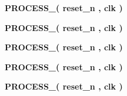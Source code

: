 \begin{DoxyCompactItemize}
\item 
{\bf P\+R\+O\+C\+E\+S\+S\+\_}{\bfseries  ( {\bfseries {\bfseries {\bf reset\+\_\+n}} \textcolor{vhdlchar}{ }} , {\bfseries {\bfseries {\bf clk}} \textcolor{vhdlchar}{ }} )}
\item 
{\bf P\+R\+O\+C\+E\+S\+S\+\_}{\bfseries  ( {\bfseries {\bfseries {\bf reset\+\_\+n}} \textcolor{vhdlchar}{ }} , {\bfseries {\bfseries {\bf clk}} \textcolor{vhdlchar}{ }} )}
\item 
{\bf P\+R\+O\+C\+E\+S\+S\+\_}{\bfseries  ( {\bfseries {\bfseries {\bf reset\+\_\+n}} \textcolor{vhdlchar}{ }} , {\bfseries {\bfseries {\bf clk}} \textcolor{vhdlchar}{ }} )}
\item 
{\bf P\+R\+O\+C\+E\+S\+S\+\_}{\bfseries  ( {\bfseries {\bfseries {\bf reset\+\_\+n}} \textcolor{vhdlchar}{ }} , {\bfseries {\bfseries {\bf clk}} \textcolor{vhdlchar}{ }} )}
\item 
{\bf P\+R\+O\+C\+E\+S\+S\+\_}{\bfseries  ( {\bfseries {\bfseries {\bf reset\+\_\+n}} \textcolor{vhdlchar}{ }} , {\bfseries {\bfseries {\bf clk}} \textcolor{vhdlchar}{ }} )}
\end{DoxyCompactItemize}
